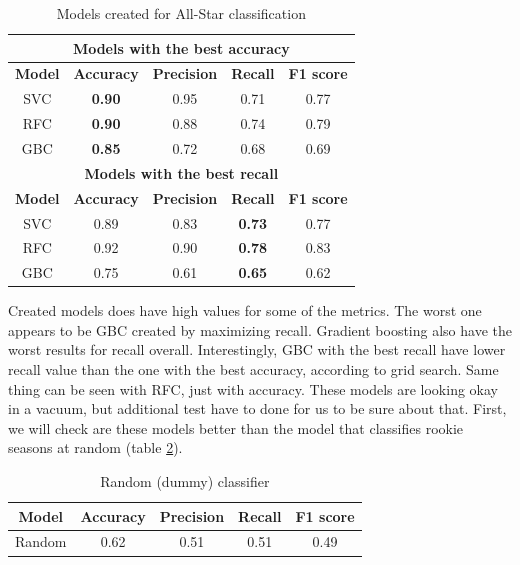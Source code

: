 \documentclass[a4paper]{article}
\begin{document}
\begin{table}[!h]
\begin{center}
\begin{tabular}{|c|c|c|c|c|} \hline
\multicolumn{5}{|c|}{\textbf{Models with the best accuracy}} \\ \hline
\textbf{Model} & \textbf{Accuracy} & \textbf{Precision} & \textbf{Recall} & \textbf{F1 score} \\ \hline
SVC & \textbf{0.90} & 0.95 & 0.71 & 0.77 \\ \hline
RFC & \textbf{0.90} & 0.88 & 0.74 & 0.79 \\ \hline
GBC & \textbf{0.85} & 0.72 & 0.68 & 0.69 \\ \hline
\multicolumn{5}{|c|}{\textbf{Models with the best recall}} \\ \hline
\textbf{Model} & \textbf{Accuracy} & \textbf{Precision} & \textbf{Recall} & \textbf{F1 score} \\ \hline
SVC & 0.89 & 0.83 & \textbf{0.73} & 0.77 \\ \hline
RFC & 0.92 & 0.90 & \textbf{0.78} & 0.83 \\ \hline
GBC & 0.75 & 0.61 & \textbf{0.65} & 0.62 \\ \hline
\end{tabular}
\caption{Models created for All-Star classification}
\label{tab:models_all_star}
\end{center}
\end{table}

Created models does have high values for some of the metrics. The worst one appears to be GBC created by maximizing recall. Gradient boosting also have the worst results for recall overall. Interestingly, GBC with the best recall have lower recall value than the one with the best accuracy, according to grid search. Same thing can be seen with RFC, just with accuracy. These models are looking okay in a vacuum, but additional test have to done for us to be sure about that. First, we will check are these models better than the model that classifies rookie seasons at random (table \ref{tab:dummy_all_star}).

\begin{table}[!h]
\begin{center}
\begin{tabular}{|c|c|c|c|c|} \hline
\textbf{Model} & \textbf{Accuracy} & \textbf{Precision} & \textbf{Recall} & \textbf{F1 score} \\ \hline
Random & 0.62 & 0.51 & 0.51 & 0.49 \\ \hline
\end{tabular}
\caption{Random (dummy) classifier}
\label{tab:dummy_all_star}
\end{center}
\end{table}
\end{document}
